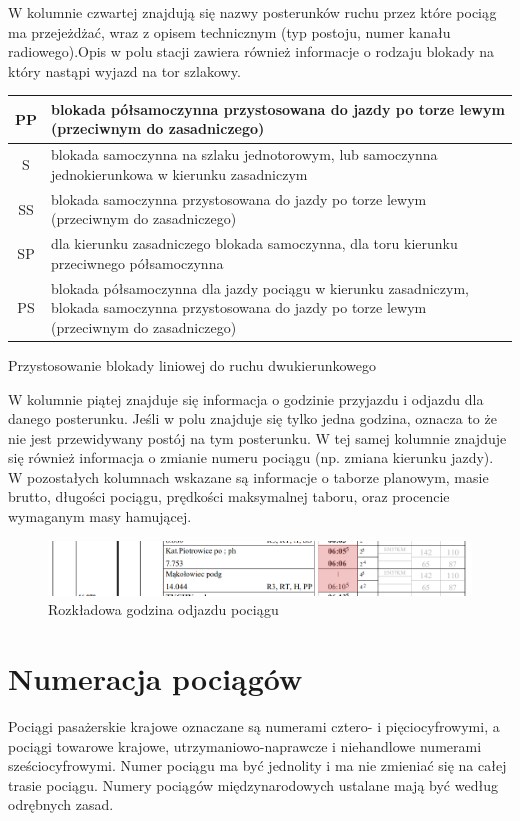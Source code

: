 W kolumnie czwartej znajdują się nazwy posterunków ruchu przez które pociąg ma przejeżdżać, wraz z opisem technicznym (typ postoju, numer kanału radiowego).Opis w polu stacji zawiera również informacje o rodzaju blokady na który nastąpi wyjazd na tor szlakowy. 
\begin{margintable}
	\begin{tabular}{|c|m{4.5cm}|}   
		\hline
		PP	& blokada półsamoczynna przystosowana do jazdy po torze lewym (przeciwnym do zasadniczego) \\ 
		\hline
		S	& blokada samoczynna na szlaku jednotorowym, lub samoczynna jednokierunkowa w kierunku zasadniczym \\ 
		\hline
		SS	& blokada samoczynna przystosowana do jazdy po torze lewym (przeciwnym do zasadniczego) \\ 
		\hline
		SP	& dla kierunku zasadniczego blokada samoczynna, dla toru kierunku przeciwnego półsamoczynna \\ 
		\hline
		PS	& blokada półsamoczynna dla jazdy pociągu w kierunku zasadniczym, blokada samoczynna przystosowana do jazdy po torze lewym (przeciwnym do zasadniczego) \\ 
		\hline
	\end{tabular} 
	\caption{Przystosowanie blokady liniowej do ruchu dwukierunkowego}
\end{margintable}
W kolumnie piątej znajduje się informacja o godzinie przyjazdu i odjazdu dla danego posterunku. Jeśli w polu znajduje się tylko jedna godzina, oznacza to że nie jest przewidywany postój na tym posterunku. W tej samej kolumnie znajduje się również informacja o zmianie numeru pociągu (np. zmiana kierunku jazdy). W pozostałych kolumnach wskazane są informacje o taborze planowym, masie brutto, długości pociągu, prędkości maksymalnej taboru, oraz procencie wymaganym masy hamującej.
\begin{figure}
	\includegraphics[width=12cm]{skryptkierownik-img/rozklad-odjaz.png}
	\caption{Rozkładowa godzina odjazdu pociągu}
\end{figure}


\section{Numeracja pociągów}

Pociągi pasa­żerskie krajowe ozna­czane są nume­rami cztero- i pięcio­cyfro­wymi, a pociągi towa­rowe krajowe, utrzymaniowo-naprawcze i niehan­dlowe nume­rami sześcio­cyfro­wymi. Numer pociągu ma być jedno­lity i ma nie zmieniać się na całej trasie pociągu. Numery pociągów międzynaro­dowych usta­lane mają być według odrębnych zasad.

